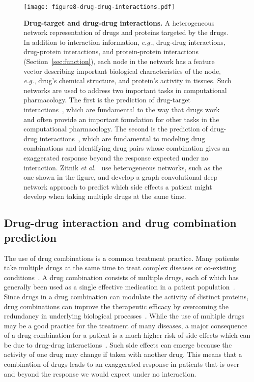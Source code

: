 \documentclass[5p]{elsarticle}
\newcommand{\eg}{\emph{e.g.}\xspace}
\newcommand{\etal}{\emph{et al.}\xspace}
\begin{document}
\begin{figure}[t]
\centering
\texttt{[image: figure8-drug-drug-interactions.pdf]}
\caption{\textbf{Drug-target and drug-drug interactions.} A heterogeneous network representation of drugs and proteins targeted by the drugs. In addition to interaction information, \eg, drug-drug interactions, drug-protein interactions, and protein-protein interactions (Section~\ref{sec:function}), each node in the network has a feature vector describing important biological characteristics of the node, \eg, drug's chemical structure, and protein's activity in tissues. Such networks are used to address two important tasks in computational pharmacology. The first is the prediction of drug-target interactions~\cite{Wang2014drug,Breinig2015chemical,Zong2017deep,Lee2017network}, which are fundamental to the way that drugs work and often provide an important foundation for other tasks in the computational pharmacology. The second is the prediction of drug-drug interactions~\cite{Vilar2014similarity,Cheng2014machine,Zitnik2016collective,Sridhar2016probabilistic}, which are fundamental to modeling drug combinations and identifying drug pairs whose combination gives an exaggerated response beyond the response expected under no interaction.  Zitnik \etal~\cite{Zitnik2018polypharmacy} use heterogeneous networks, such as the one shown in the figure, and develop a graph convolutional deep network approach to predict which side effects a patient might develop when taking multiple drugs at the same time.}
\label{fig:drug-drug-interactions}
\end{figure}

\subsection{Drug-drug interaction and drug combination prediction}

The use of drug combinations is a common treatment practice.
Many patients take multiple drugs at the same time to treat complex diseases or co-existing conditions~\cite{Han2017synergistic}.
A drug combination consists of multiple drugs, each of which has generally been used as a single effective medication in a patient population~\cite{Jia2009mechanisms}.
Since drugs in a drug combination can modulate the activity of distinct proteins, drug combinations can improve the therapeutic efficacy by overcoming the redundancy in underlying biological processes~\cite{Sun2015combining}.
While the use of multiple drugs may be a good practice for the treatment of many diseases, a major consequence of a drug combination for a patient is a much higher risk of side effects which can be due to drug-drug interactions~\cite{Zitnik2014drug,Woo2017integrative}.
Such side effects can emerge because the activity of one drug may change if taken with another drug.
This means that a combination of drugs leads to an exaggerated response in patients that is over and beyond the response we would expect under no interaction.
\end{document}
